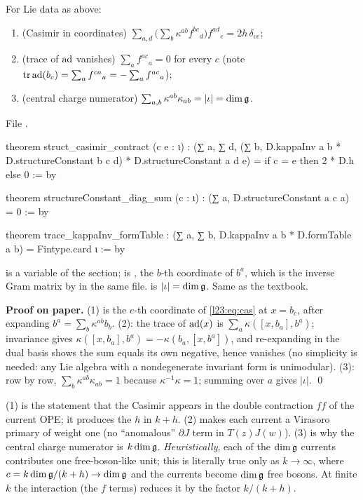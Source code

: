 \begin{proposition}\label{l23:prop:finite}
For Lie data as above:
\begin{enumerate}
\item (Casimir in coordinates) $\sum_{a,d}\big(\sum_b\kappa^{ab}f^{bc}{}_d\big)f^{ad}{}_e=2h\,\delta_{ce}$;
\item (trace of $\operatorname{ad}$ vanishes) $\sum_a f^{ac}{}_a=0$ for every $c$ (note $\operatorname{tr}\operatorname{ad}(b_c)=\sum_af^{ca}{}_a=-\sum_af^{ac}{}_a$);
\item (central charge numerator) $\sum_{a,b}\kappa^{ab}\kappa_{ab}=|\iota|=\dim\mathfrak g$.
\end{enumerate}
\end{proposition}
\noindent File .
\begin{leancode}
theorem struct_casimir_contract (c e : ι) :
    (∑ a, ∑ d, (∑ b, D.kappaInv a b * D.structureConstant b c d) * D.structureConstant a d e) =
      if c = e then 2 * D.h else 0 := by

theorem structureConstant_diag_sum (c : ι) : (∑ a, D.structureConstant a c a) = 0 := by

theorem trace_kappaInv_formTable :
    (∑ a, ∑ b, D.kappaInv a b * D.formTable a b) = Fintype.card ι := by
\end{leancode}

\begin{dictionary}
 is a variable of the section;  is ,
the $b$-th coordinate of $b^a$, which is the inverse Gram matrix by  in the same file.
 is $|\iota|=\dim\mathfrak g$. Same as the textbook.
\end{dictionary}

\textbf{Proof on paper.} (1) is the $e$-th coordinate of \eqref{l23:eq:cas} at $x=b_c$, after expanding
$b^a=\sum_b\kappa^{ab}b_b$. (2): the trace of $\operatorname{ad}(x)$ is $\sum_a\kappa([x,b_a],b^a)$; invariance gives
$\kappa([x,b_a],b^a)=-\kappa(b_a,[x,b^a])$, and re-expanding in the dual basis shows the sum equals its own negative,
hence vanishes (no simplicity is needed: any Lie algebra with a nondegenerate invariant form is unimodular).
(3): row by row, $\sum_b\kappa^{ab}\kappa_{ab}=1$ because $\kappa^{-1}\kappa=1$; summing over $a$ gives $|\iota|$. \qed

\begin{physics}
(1) is the statement that the Casimir appears in the double contraction $f f$ of the current OPE; it produces the
$h$ in $k+h$. (2) makes each current a Virasoro primary of weight one (no ``anomalous'' $\partial J$ term in
$T(z)J(w)$). (3) is why the central charge numerator is $k\dim\mathfrak g$. \emph{Heuristically}, each of the $\dim\mathfrak g$
currents contributes one free-boson-like unit; this is literally true only as $k\to\infty$, where $c=k\dim\mathfrak g/(k+h)\to\dim\mathfrak g$
and the currents become $\dim\mathfrak g$ free bosons. At finite $k$ the interaction (the $f$ terms) reduces it by the factor $k/(k+h)$.
\end{physics}

